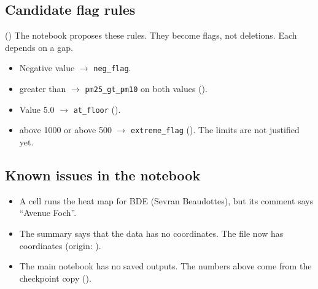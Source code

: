 \documentclass[11pt]{article}
\begin{document}
\subsection{Candidate flag rules} \sProposed{} ()
The notebook proposes these rules. They become flags, not deletions. Each depends on a gap.
\begin{itemize}
  \item Negative value $\rightarrow$ \texttt{neg\_flag}.
  \item \pmtwofive{} greater than \pmten{} $\rightarrow$ \texttt{pm25\_gt\_pm10} on both values ().
  \item Value 5.0 $\rightarrow$ \texttt{at\_floor} ().
  \item \pmten{} above 1000 or \pmtwofive{} above 500 $\rightarrow$ \texttt{extreme\_flag} (). The limits are not justified yet.
\end{itemize}

\subsection{Known issues in the notebook}
\begin{itemize}
  \item A cell runs the heat map for BDE (Sevran Beaudottes), but its comment says ``Avenue Foch''.
  \item The summary says that the data has no coordinates. The file  now has coordinates (origin: ).
  \item The main notebook has no saved outputs. The numbers above come from the checkpoint copy ().
\end{itemize}
\end{document}
